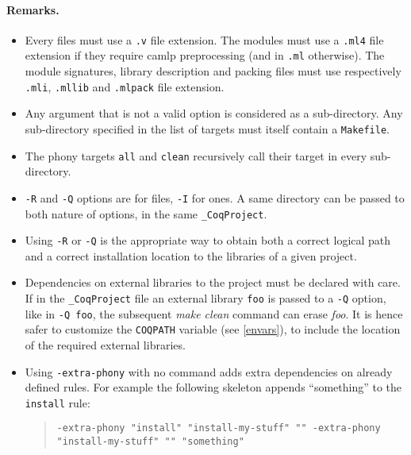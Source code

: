 \paragraph{Remarks.}

\begin{itemize}
\item Every {\Coq} files must use a \texttt{.v} file extension.
 The {\ocaml} modules must use a \texttt{.ml4} file extension
 if they require camlp preprocessing (and in \texttt{.ml} otherwise).
 The {\ocaml} module signatures, library
 description and packing files must use respectively \texttt{.mli},
 \texttt{.mllib} and \texttt{.mlpack} file extension.

\item Any argument that is not a valid option is considered as a
  sub-directory. Any sub-directory specified in the list of targets must
  itself contain a \texttt{Makefile}.

\item The phony targets \texttt{all} and \texttt{clean} recursively
  call their target in every sub-directory.

\item \texttt{-R} and \texttt{-Q} options are for {\Coq} files, \texttt{-I}
  for {\ocaml} ones. A same directory can be passed to both nature of
  options, in the same \texttt{\_CoqProject}.

\item Using \texttt{-R} or \texttt{-Q} is the appropriate way to
  obtain both a correct logical path and a correct installation location to
  the libraries of a given project.

\item Dependencies on external libraries to the project must be
  declared with care. If in the \texttt{\_CoqProject} file an external
  library \texttt{foo} is passed to a \texttt{-Q} option, like in
  \texttt{-Q foo}, the subsequent \textit{make clean} command can
  erase \textit{foo}. It is hence safer to customize the
  \texttt{COQPATH} variable (see \ref{envars}), to include the
  location of the required external libraries.

\item Using \texttt{-extra-phony} with no command adds extra
  dependencies on already defined rules. For example the following
  skeleton appends ``something'' to the \texttt{install} rule:
\begin{quotation}
\texttt{-extra-phony "install" "install-my-stuff" ""
  -extra-phony "install-my-stuff" "" "something"}
\end{quotation}
\end{itemize}



